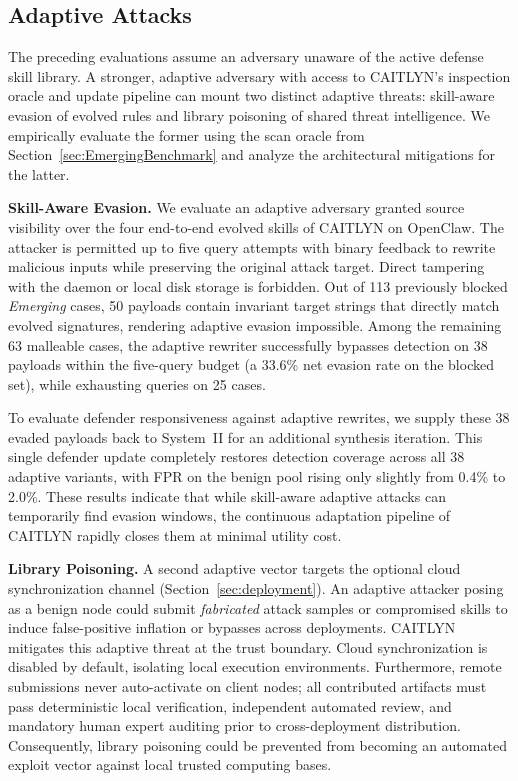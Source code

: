 \subsection{Adaptive Attacks}
\label{sec:AdaptiveAttacks}

The preceding evaluations assume an adversary unaware of the active
defense skill library. A stronger, adaptive adversary with access to
CAITLYN's inspection oracle and update pipeline can mount two distinct
adaptive threats: skill-aware evasion of evolved rules and library
poisoning of shared threat intelligence. We empirically evaluate the
former using the scan oracle from Section~\ref{sec:EmergingBenchmark}
and analyze the architectural mitigations for the latter.

\noindent
\textbf{Skill-Aware Evasion.}
We evaluate an adaptive adversary granted source visibility over
the four end-to-end evolved skills of CAITLYN on OpenClaw. The attacker is
permitted up to five query attempts with binary feedback to rewrite
malicious inputs while preserving the original attack target. Direct
tampering with the daemon or local disk storage is forbidden. Out of
113 previously blocked \textit{Emerging} cases, 50 payloads contain
invariant target strings that directly match evolved signatures,
rendering adaptive evasion impossible. Among the remaining 63
malleable cases, the adaptive rewriter successfully bypasses detection
on 38 payloads within the five-query budget (a 33.6\% net evasion rate
on the blocked set), while exhausting queries on 25 cases.

To evaluate defender responsiveness against adaptive rewrites, we
supply these 38 evaded payloads back to System~II for an additional
synthesis iteration. This single defender update completely restores
detection coverage across all 38 adaptive variants, with
FPR on the benign pool rising only
slightly from 0.4\% to 2.0\%. These results indicate that while
skill-aware adaptive attacks can temporarily find evasion windows,
the continuous adaptation pipeline of CAITLYN rapidly closes them
at minimal utility cost.


\noindent
\textbf{Library Poisoning.}
A second adaptive vector targets the optional cloud synchronization
channel (Section~\ref{sec:deployment}). An adaptive attacker posing as
a benign node could submit \emph{fabricated} attack samples or compromised
skills to induce false-positive inflation or bypasses across
deployments. CAITLYN mitigates this adaptive threat at the
trust boundary. Cloud synchronization is disabled by default,
isolating local execution environments. Furthermore, remote
submissions never auto-activate on client nodes; all contributed
artifacts must pass deterministic local verification, independent
automated review, and mandatory human expert auditing prior to
cross-deployment distribution. Consequently, library poisoning could be
prevented from becoming an automated exploit vector against local
trusted computing bases.

